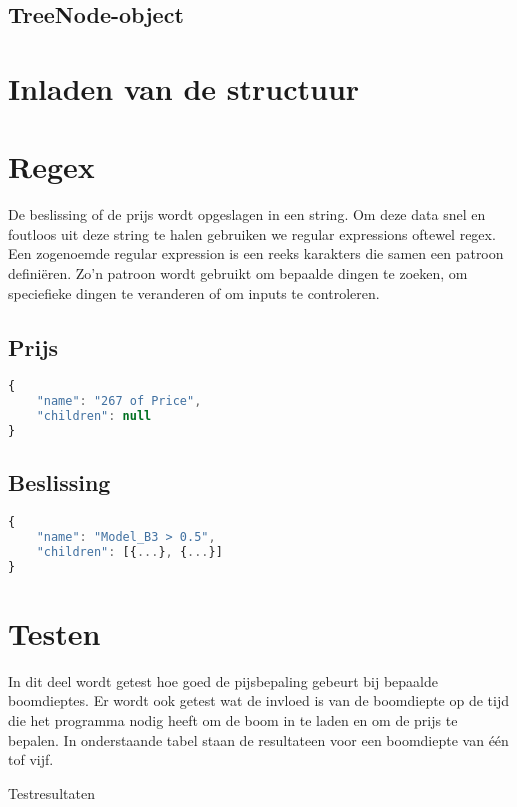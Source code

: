 \subsection{TreeNode-object}

\section{Inladen van de structuur}

\section{Regex}
De beslissing of de prijs wordt opgeslagen in een string. Om deze data snel en foutloos uit deze string te halen gebruiken we regular expressions oftewel regex. Een zogenoemde regular expression is een reeks karakters die samen een patroon definiëren. Zo'n patroon wordt gebruikt om bepaalde dingen te zoeken, om speciefieke dingen te veranderen of om inputs te controleren.\cite{wiki:regex}

\subsection{Prijs}
\begin{lstlisting}[language=JavaScript]
{
    "name": "267 of Price",
    "children": null
}
\end{lstlisting}
\subsection{Beslissing}

\begin{lstlisting}[language=JavaScript]
{
    "name": "Model_B3 > 0.5",
    "children": [{...}, {...}]
}
\end{lstlisting}

\section{Testen}
In dit deel wordt getest hoe goed de pijsbepaling gebeurt bij bepaalde boomdieptes. Er wordt ook getest wat de invloed is van de boomdiepte op de tijd die het programma nodig heeft om de boom in te laden en om de prijs te bepalen. In onderstaande tabel staan de resultateen voor een boomdiepte van één tof vijf.
\begin{table}
    \centering
    \caption{Testresultaten}
    \label{tab:test_results}
\end{table}

